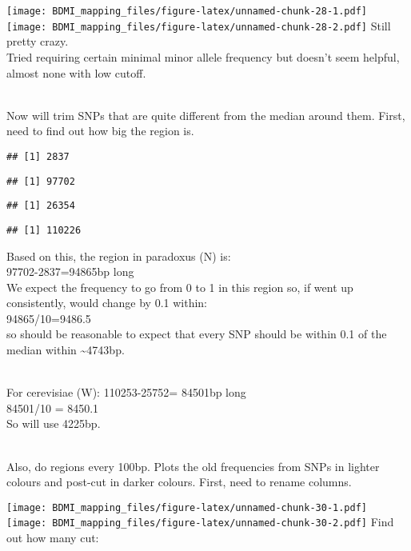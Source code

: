 \documentclass[
]{article}
\newenvironment{Shaded}{\begin{snugshade}}{\end{snugshade}}
\newcommand{\FunctionTok}[1]{\textcolor[rgb]{0.13,0.29,0.53}{\textbf{#1}}}
\newcommand{\NormalTok}[1]{#1}
\newcommand{\SpecialCharTok}[1]{\textcolor[rgb]{0.81,0.36,0.00}{\textbf{#1}}}
\begin{document}
\texttt{[image: BDMI\_mapping\_files/figure-latex/unnamed-chunk-28-1.pdf]}
\texttt{[image: BDMI\_mapping\_files/figure-latex/unnamed-chunk-28-2.pdf]}
Still pretty crazy.\\
Tried requiring certain minimal minor allele frequency but doesn't seem
helpful, almost none with low cutoff.\\
\strut \\
Now will trim SNPs that are quite different from the median around them.
First, need to find out how big the region is.

\begin{verbatim}
## [1] 2837
\end{verbatim}

\begin{verbatim}
## [1] 97702
\end{verbatim}

\begin{verbatim}
## [1] 26354
\end{verbatim}

\begin{verbatim}
## [1] 110226
\end{verbatim}

Based on this, the region in paradoxus (N) is:\\
97702-2837=94865bp long\\
We expect the frequency to go from 0 to 1 in this region so, if went up
consistently, would change by 0.1 within:\\
94865/10=9486.5\\
so should be reasonable to expect that every SNP should be within 0.1 of
the median within \textasciitilde4743bp.\\
\strut \\
For cerevisiae (W): 110253-25752= 84501bp long\\
84501/10 = 8450.1\\
So will use 4225bp.\\
\strut \\
Also, do regions every 100bp. Plots the old frequencies from SNPs in
lighter colours and post-cut in darker colours. First, need to rename
columns.

\texttt{[image: BDMI\_mapping\_files/figure-latex/unnamed-chunk-30-1.pdf]}
\texttt{[image: BDMI\_mapping\_files/figure-latex/unnamed-chunk-30-2.pdf]}
Find out how many cut:

\begin{Shaded}
\end{Shaded}
\end{document}
